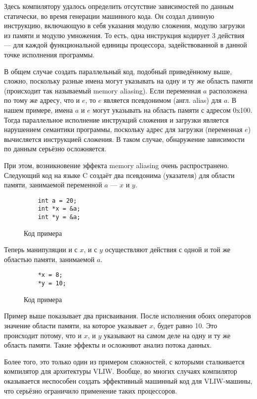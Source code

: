 Здесь компилятору удалось определить отсутствие зависимостей по данным статически, во время генерации машинного кода. Он создал длинную инструкцию, включающую в себя указания модулю сложения, модулю загрузки из памяти и модулю умножения. То есть, одна инструкция кодирует 3 действия --- для каждой функциональной единицы процессора, задействованной в данной точке исполнения программы.

В общем случае создать параллельный код, подобный приведённому выше, сложно, поскольку разные имена могут указывать на одну и ту же область памяти (происходит так называемый memory aliasing). Если переменная $a$ расположена по тому же адресу, что и $e$, то $e$ является псевдонимом (англ. alias) для $a$. В нашем примере, имена $a$ и $e$ могут указывать на область памяти с адресом 0x100. Тогда параллельное исполнение инструкций сложения и загрузки является нарушением семантики программы, поскольку адрес для загрузки (переменная $e$) вычисляется инструкцией сложения. В таком случае, обнаружение зависимости по данным серьёзно осложняется.

При этом, возникновение эффекта memory aliasing очень распространено. Следующий код на языке C создаёт два псевдонима (указателя) для области памяти, занимаемой переменной $a$ --- $x$ и $y$.

\begin{figure}[H]
    \begin{verbatim}
    int a = 20;
    int *x = &a;
    int *y = &a;
    \end{verbatim}
    \label{fig:aliasing}
    \caption{Код примера}
\end{figure}

Теперь манипуляции и с $x$, и с $y$ осуществляют действия с одной и той же областью памяти, занимаемой $a$.

\begin{figure}[H]
    \begin{verbatim}
    *x = 8;
    *y = 10;
    \end{verbatim}
    \label{fig:aliasing-2}
    \caption{Код примера}
\end{figure}

Пример выше показывает два присваивания. После исполнения обоих операторов значение области памяти, на которое указывает $x$, будет равно 10. Это происходит потому, что и $x$, и $y$ указывают на самом деле на одну и ту же область памяти. Такие эффекты и осложняют анализ потока данных.

Более того, это только один из примером сложностей, с которыми сталкивается компилятор для архитектуры VLIW. Вообще, во многих случаях компилятор оказывается неспособен создать эффективный машинный код для VLIW-машины, что серьёзно ограничило применение таких процессоров.

